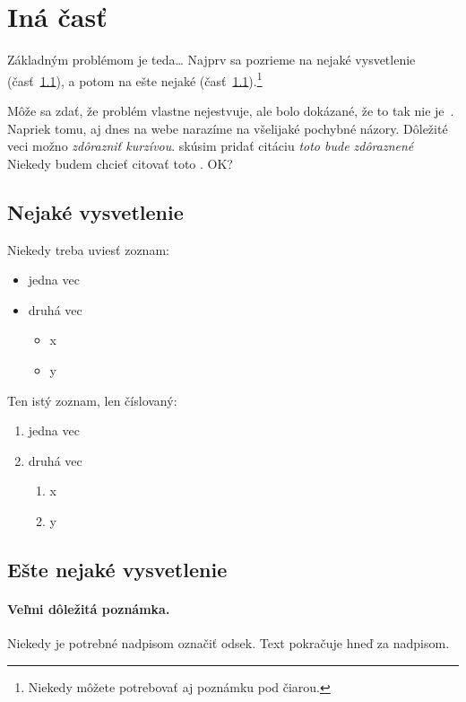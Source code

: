 \documentclass[10pt,twoside,slovak,a4paper]{article}
\begin{document}
\section{Iná časť} \label{ina}

Základným problémom je teda\ldots{} Najprv sa pozrieme na nejaké vysvetlenie (časť~\ref{ina:nejake}), a potom na ešte nejaké (časť~\ref{ina:nejake}).\footnote{Niekedy môžete potrebovať aj poznámku pod čiarou.}

Môže sa zdať, že problém vlastne nejestvuje\cite{Coplien:MPD}, ale bolo dokázané, že to tak nie je~\cite{Czarnecki:Staged, Czarnecki:Progress}. Napriek tomu, aj dnes na webe narazíme na všelijaké pochybné názory\cite{PLP-Framework}. Dôležité veci možno \emph{zdôrazniť kurzívou}.
\cite{Osman:RE} skúsim pridať citáciu \emph{toto bude zdôraznené}
Niekedy budem chcieť citovať toto \cite{Osama:Adoption}. OK?


\subsection{Nejaké vysvetlenie} \label{ina:nejake}

Niekedy treba uviesť zoznam:

\begin{itemize}
\item jedna vec
\item druhá vec
	\begin{itemize}
	\item x
	\item y
	\end{itemize}
\end{itemize}

Ten istý zoznam, len číslovaný:

\begin{enumerate}
\item jedna vec
\item druhá vec
	\begin{enumerate}
	\item x
	\item y
	\end{enumerate}
\end{enumerate}


\subsection{Ešte nejaké vysvetlenie} \label{ina:este}

\paragraph{Veľmi dôležitá poznámka.}
Niekedy je potrebné nadpisom označiť odsek. Text pokračuje hneď za nadpisom.
\end{document}
